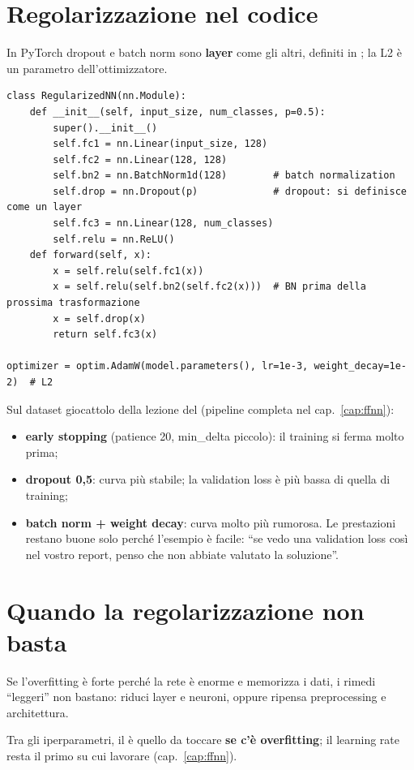 \section{Regolarizzazione nel codice}
In PyTorch dropout e batch norm sono \textbf{layer} come gli altri, definiti in ; la L2 è un parametro
dell'ottimizzatore.
\begin{lstlisting}
class RegularizedNN(nn.Module):
    def __init__(self, input_size, num_classes, p=0.5):
        super().__init__()
        self.fc1 = nn.Linear(input_size, 128)
        self.fc2 = nn.Linear(128, 128)
        self.bn2 = nn.BatchNorm1d(128)        # batch normalization
        self.drop = nn.Dropout(p)             # dropout: si definisce come un layer
        self.fc3 = nn.Linear(128, num_classes)
        self.relu = nn.ReLU()
    def forward(self, x):
        x = self.relu(self.fc1(x))
        x = self.relu(self.bn2(self.fc2(x)))  # BN prima della prossima trasformazione
        x = self.drop(x)
        return self.fc3(x)

optimizer = optim.AdamW(model.parameters(), lr=1e-3, weight_decay=1e-2)  # L2
\end{lstlisting}

\begin{esempio}
Sul dataset giocattolo della lezione del  (pipeline completa nel cap.~\ref{cap:ffnn}):
\begin{itemize}
  \item \textbf{early stopping} (patience 20, min\_delta piccolo): il training si ferma molto prima;
  \item \textbf{dropout 0,5}: curva più stabile; la validation loss è più bassa di quella di training;
  \item \textbf{batch norm + weight decay}: curva molto più rumorosa. Le prestazioni restano buone solo perché l'esempio è facile:
        ``se vedo una validation loss così nel vostro report, penso che non abbiate valutato la soluzione''.
\end{itemize}
\end{esempio}

\section{Quando la regolarizzazione non basta}
\begin{attenzione}
Se l'overfitting è forte perché la rete è enorme e memorizza i dati, i rimedi ``leggeri'' non bastano: riduci layer e
neuroni, oppure ripensa preprocessing e architettura.
\end{attenzione}
Tra gli iperparametri, il  è quello da toccare \textbf{se c'è overfitting}; il learning rate resta il primo su cui
lavorare (cap.~\ref{cap:ffnn}).

